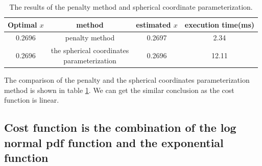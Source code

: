 \documentclass[a4paper,12pt]{article}
\begin{document}

\begin{table}[!ht]
\begin{center}
\begin{tabular}{|c|c|c|c|}
\hline
Optimal $x$& method & estimated $x$&execution time(ms)\\
\hline
0.2696& penalty method&0.2697&2.34\\
\hline
0.2696&  \makecell{ the spherical coordinates \\parameterization}&0.2696&12.11\\

\hline
\end{tabular}
\end{center}
\caption{The results of the penalty method and spherical coordinate parameterization.}
\label{tab:poly}
\end{table}


The comparison of the penalty and the spherical coordinates parameterization method is shown in table \ref{tab:poly}. We can get the similar conclusion as the cost function is linear. \\

\subsection{Cost function is the combination of the log normal pdf function and the exponential function }



  
 
\end{document}
